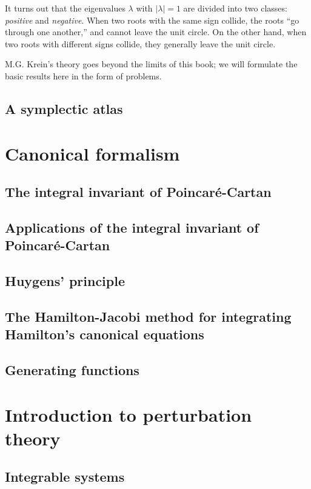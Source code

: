 \documentclass[leqno]{report}
\numberwithin{equation}{section}
\theoremstyle{plain}
\theoremstyle{definition}
\theoremstyle{remark}
\theoremstyle{smallcap}
\numberwithin{prob}{section}
\begin{document}
It turns out that the eigenvalues $\lambda$ with $|\lambda| = 1$
are divided into two classes:
\emph{positive} and \emph{negative}.
%
When two roots with the same sign collide,
the roots ``go through one another,''
and cannot leave the unit circle.
%
On the other hand,
when two roots with different signs collide,
they generally leave the unit circle.

M.G. Krein's theory goes beyond the limits of this book;
we will formulate the basic results here in the form of problems.




\section{A symplectic atlas}

\chapter{Canonical formalism}

\section{The integral invariant of Poincar\'e-Cartan}

\section{Applications of the integral invariant of Poincar\'e-Cartan}

\section{Huygens' principle}

\section{The Hamilton-Jacobi method for integrating Hamilton's canonical equations}

\section{Generating functions}

\chapter{Introduction to perturbation theory}

\section{Integrable systems}
\end{document}
